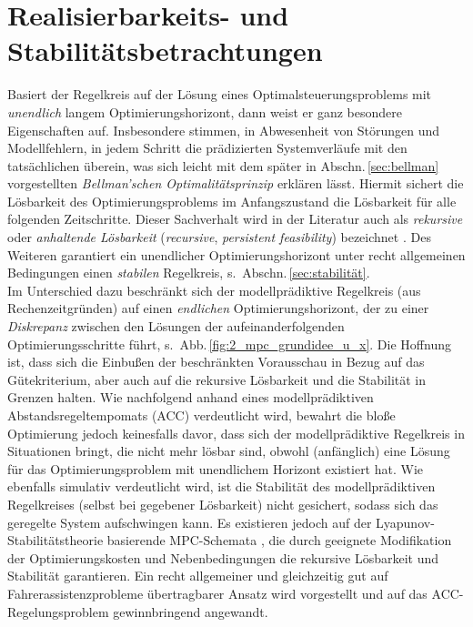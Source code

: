 \section{Realisierbarkeits- und Stabilitätsbetrachtungen} \label{sec:stab_mpc}
Basiert der Regelkreis auf der Lösung eines Optimalsteuerungsproblems mit \emph{unendlich} langem Optimierungshorizont, dann weist er ganz besondere Eigenschaften auf. Insbesondere stimmen, in Abwesenheit von Störungen und Modellfehlern, in jedem Schritt die prädizierten Systemverläufe mit den tatsächlichen überein, was sich leicht mit dem später in Abschn.\,\ref{sec:bellman} vorgestellten \emph{Bellman'schen Optimalitätsprinzip} erklären lässt. Hiermit sichert die Lösbarkeit des Optimierungsproblems im Anfangszustand die Lösbarkeit für alle folgenden
Zeitschritte.
Dieser Sachverhalt wird in der Literatur auch als \emph{rekursive} oder \emph{anhaltende Lösbarkeit} (\emph{recursive}, \emph{persistent feasibility}) bezeichnet \cite{borrelli2014predictive, gruene2011nonlinear}. Des Weiteren garantiert ein unendlicher Optimierungshorizont unter recht allgemeinen Bedingungen \cite{borrelli2014predictive, gruene2011nonlinear, Findeisen2002} einen \emph{stabilen} Regelkreis, s.\ Abschn.\,\ref{sec:stabilität}. \\
Im Unterschied dazu beschränkt sich der modellprädiktive Regelkreis (aus Rechenzeitgründen) auf einen \emph{endlichen} Optimierungshorizont, der  
\iA zu einer \emph{Diskrepanz} zwischen den Lösungen der aufeinanderfolgenden Optimierungsschritte führt, s.\ Abb.\,\ref{fig:2_mpc_grundidee_u_x}. Die Hoffnung ist, dass sich die Einbußen der beschränkten Vorausschau in Bezug auf das Gütekriterium, aber auch auf die rekursive Lösbarkeit und die Stabilität in Grenzen halten. Wie nachfolgend anhand eines modellprädiktiven Abstandsregeltempomats (ACC) verdeutlicht wird, bewahrt die bloße Optimierung jedoch keinesfalls davor, dass sich der modellprädiktive Regelkreis in Situationen bringt, die nicht mehr lösbar sind, obwohl (anfänglich) eine Lösung für das Optimierungsproblem mit unendlichem Horizont existiert hat.
Wie ebenfalls simulativ verdeutlicht wird, ist die Stabilität des modellprädiktiven Regelkreises (selbst bei gegebener Lösbarkeit) nicht gesichert, sodass sich das geregelte System aufschwingen kann.
Es existieren jedoch auf der Lyapunov-Stabilitätstheorie basierende MPC-Schemata \cite{borrelli2014predictive, gruene2011nonlinear, Findeisen2002}, die durch geeignete Modifikation der Optimierungskosten und Nebenbedingungen die rekursive Lösbarkeit und Stabilität garantieren. Ein recht allgemeiner und gleichzeitig gut auf Fahrerassistenzprobleme übertragbarer Ansatz wird vorgestellt und auf das ACC-Regelungsproblem gewinnbringend angewandt. 

